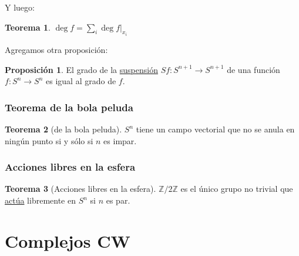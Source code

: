 \documentclass[spanish]{book}
\theoremstyle{definition}
\newtheorem*{teo}{Teorema}
\newtheorem*{prop}{Proposición}
\newcommand{\Z}{\mathbb{Z}}
\begin{document}
	Y luego:
	\begin{teo}
		$\deg f=\sum_i\deg f|_{x_i}$
	\end{teo}
	Agregamos otra proposición:
	\begin{prop}
		El grado de la \hyperref[fsusp]{suspensión} $Sf:S^{n+1}\to S^{n+1}$ de una función $f:S^n\to S^n$ es igual al grado de $f$.
	\end{prop}
\subsection{Teorema de la bola peluda}
	\begin{teo}[de la bola peluda]
		$S^n$ tiene un campo vectorial que no se anula en ningún punto si y sólo si $n$ es impar.
	\end{teo}

\subsection{Acciones libres en la esfera}
	\begin{teo}[Acciones libres en la esfera]
		$\Z/2\Z$ es el único grupo no trivial que \hyperref[sec:acciones]{actúa} libremente en $S^n$ si $n$ es par.
	\end{teo}

\chapter{Complejos CW}
\end{document}
